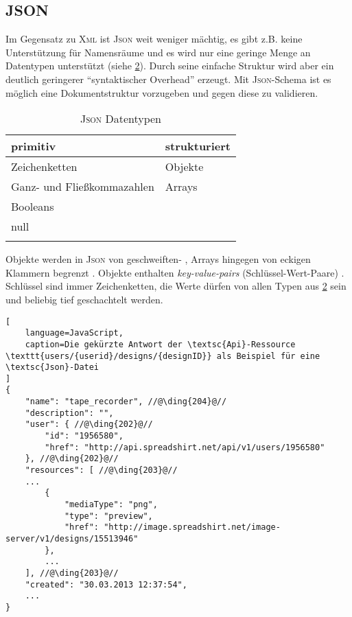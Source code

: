 \subsection{JSON}
\label{sec:json}


Im Gegensatz zu \textsc{Xml} ist \textsc{Json} weit weniger mächtig, es gibt z.B. keine Unterstützung für Namensräume und es wird nur eine geringe Menge an Datentypen unterstützt (siehe \cref{tab:jsonDatatypes}). 
Durch seine einfache Struktur wird aber ein deutlich geringerer \enquote{syntaktischer Overhead} erzeugt.
Mit \textsc{Json}-Schema \cite{json-schema-draft} ist es möglich eine Dokumentstruktur vorzugeben und gegen diese zu validieren. 

\begin{table}[tb]
    \begin{longtable}[c]{l l}
        \toprule
        \rowcolor{lightgray}
        \textbf{primitiv}   & \textbf{strukturiert}\\
        \midrule
        Zeichenketten       & Objekte\\
        Ganz- und 
        Fließkommazahlen    & Arrays\\
        Booleans            & \\
        null                & \\
        \bottomrule
        \caption{\textsc{Json} Datentypen}
        \label{tab:jsonDatatypes}
    \end{longtable}
\end{table}

Objekte werden in \textsc{Json} von geschweiften- , Arrays hingegen von eckigen Klammern begrenzt . 
Objekte enthalten \emph{key-value-pairs} (Schlüssel-Wert-Paare) . Schlüssel sind immer Zeichenketten, die Werte dürfen von allen Typen aus \cref{tab:jsonDatatypes} sein und beliebig tief geschachtelt werden.
%
%
\begin{lstlisting}[
    language=JavaScript,
    caption=Die gekürzte Antwort der \textsc{Api}-Ressource \texttt{users/{userid}/designs/{designID}} als Beispiel für eine \textsc{Json}-Datei
]
{
    "name": "tape_recorder", //@\ding{204}@//
    "description": "",
    "user": { //@\ding{202}@//
        "id": "1956580",
        "href": "http://api.spreadshirt.net/api/v1/users/1956580"
    }, //@\ding{202}@//
    "resources": [ //@\ding{203}@//
    ...
        {
            "mediaType": "png",
            "type": "preview",
            "href": "http://image.spreadshirt.net/image-server/v1/designs/15513946"
        }, 
        ...
    ], //@\ding{203}@//
    "created": "30.03.2013 12:37:54",
    ...
}
\end{lstlisting}    

